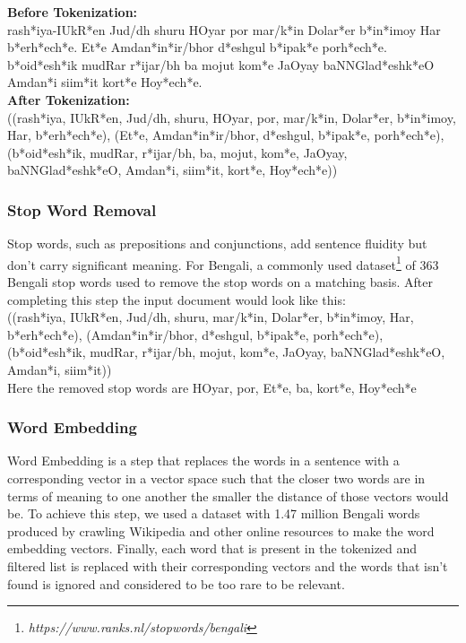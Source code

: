 \textbf{Before Tokenization:}\\
{\bng
    ra\*sh*iya-IU\*kR*en Jud/dh shuru HOyar por ma\*r/k*in Dola\*r*er \*b*i\*n*imoy Har \*b*e\*rh*e\*ch*e.
    E\*t*e Amda\*n*i\*n*ir/bhor \*d*eshgul \*b*ipa\*k*e po\*rh*e\*ch*e.
    \*b*{oi}\*d*e\*sh*ik mudRar \*r*ijar/bh ba mojut ko\*m*e JaOyay baNNGla\*d*esh\*k*eO Amda\*n*i sii\*m*it
    kor\*t*e Ho\*y*e\*ch*e.
}\\

\textbf{After Tokenization:}\\
{\bng
    ((ra\*sh*iya, IU\*kR*en, Jud/dh, shuru, HOyar, por, ma\*r/k*in, Dola\*r*er, \*b*i\*n*imoy, Har, \*b*e\*rh*e\*ch*e),
    (E\*t*e, Amda\*n*i\*n*ir/bhor, \*d*eshgul, \*b*ipa\*k*e, po\*rh*e\*ch*e),
    (\*b*{oi}\*d*e\*sh*ik, mudRar, \*r*ijar/bh, ba, mojut, ko\*m*e, JaOyay, baNNGla\*d*esh\*k*eO, Amda\*n*i,
    sii\*m*it, kor\*t*e, Ho\*y*e\*ch*e))
}

\subsubsection{Stop Word Removal}

Stop words, such as prepositions and conjunctions, add sentence fluidity but don’t carry significant meaning.
For Bengali, a commonly used dataset\footnote{\textit{https://www.ranks.nl/stopwords/bengali}} of 363 Bengali stop
words used to remove the stop words on a matching basis.
After completing this step the input document would look like this:\\
{\bng
    ((ra\*sh*iya, IU\*kR*en, Jud/dh, shuru, ma\*r/k*in, Dola\*r*er, \*b*i\*n*imoy, Har, \*b*e\*rh*e\*ch*e),
    (Amda\*n*i\*n*ir/bhor, \*d*eshgul, \*b*ipa\*k*e, po\*rh*e\*ch*e),
    (\*b*{oi}\*d*e\*sh*ik, mudRar, \*r*ijar/bh, mojut, ko\*m*e, JaOyay, baNNGla\*d*esh\*k*eO, Amda\*n*i, sii\*m*it))
}\\
Here the removed stop words are {\bng HOyar, por, E\*t*e, ba, kor\*t*e, Ho\*y*e\*ch*e}

\subsubsection{Word Embedding}
Word Embedding is a step that replaces the words in a sentence with a corresponding vector in a vector
space such that the closer two words are in terms of meaning to one another the smaller the distance
of those vectors would be.
To achieve this step, we used a dataset with 1.47 million Bengali words produced by \citeauthor{grave-etal-2018-fasttext}
\cite{grave-etal-2018-fasttext} crawling Wikipedia and other online resources to make the word embedding vectors.
Finally, each word that is present in the tokenized and filtered list is replaced with their
corresponding vectors and the words that isn't found is ignored and considered to be too rare to be relevant.

